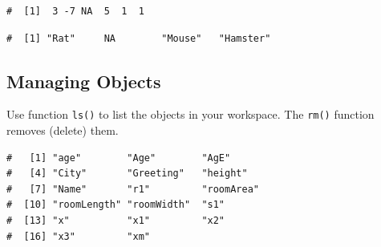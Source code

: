 \documentclass[a4paper,9pt,twocolumn,twoside,printwatermark=false]{pinp}
\begin{document}
\begin{ShadedResult}
\begin{verbatim}
#  [1]  3 -7 NA  5  1  1
\end{verbatim}
\end{ShadedResult}

\begin{Shaded}
\begin{Highlighting}[]
\StringTok{ }\NormalTok{(}\NormalTok{, }\NormalTok{, }\NormalTok{, }\NormalTok{)}
\end{Highlighting}
\end{Shaded}

\begin{ShadedResult}
\begin{verbatim}
#  [1] "Rat"     NA        "Mouse"   "Hamster"
\end{verbatim}
\end{ShadedResult}

\subsection{Managing Objects}\label{managing-objects}

Use function \texttt{ls()} to list the objects in your workspace. The
\texttt{rm()} function removes (delete) them.

\begin{Shaded}
\begin{Highlighting}[]
\NormalTok{()}
\end{Highlighting}
\end{Shaded}

\begin{ShadedResult}
\begin{verbatim}
#   [1] "age"        "Age"        "AgE"       
#   [4] "City"       "Greeting"   "height"    
#   [7] "Name"       "r1"         "roomArea"  
#  [10] "roomLength" "roomWidth"  "s1"        
#  [13] "x"          "x1"         "x2"        
#  [16] "x3"         "xm"
\end{verbatim}
\end{ShadedResult}

\begin{Shaded}
\begin{Highlighting}[]
\end{Highlighting}
\end{Shaded}
\end{document}
